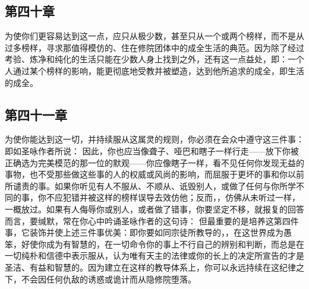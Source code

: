 \subsection{第四十章}

\par

为使你们更容易达到这一点，应只从极少数，甚至只从一个或两个榜样，而不是从过多榜样，寻求那值得模仿的、住在修院团体中的成全生活的典范。因为除了经过考验、炼净和纯化的生活只能在少数人身上找到之外，还有这一点益处，即：一个人通过某个榜样的影响，能更彻底地受教并被塑造，达到他所追求的成全，即生活的成全。\par


\subsection{第四十一章}

\par

为使你能达到这一切，并持续服从这属灵的规则，你必须在会众中遵守这三件事：即如圣咏作者所说： 因此，你也应当像聋子、哑巴和瞎子一样行走——放下你被正确选为完美模范的那一位的默观——你应像瞎子一样，看不见任何你发现无益的事物，也不受那些做这些事的人的权威或风尚的影响，而屈服于更坏的事和你以前所谴责的事。如果你听见有人不服从、不顺从、诋毁别人，或做了任何与你所学不同的事，你不应犯错并被这样的榜样误导去效仿他；反而，，仿佛从未听过一样，一概放过。如果有人侮辱你或别人，或者做了错事，你要坚定不移，就报复的回答而言，要缄默，常在你心中吟诵圣咏作者的这句诗： 但最重要的是培养这第四件事，它装饰并使上述三件事优美：即你要如同宗徒所教导的，，在这世界成为愚笨，好使你成为有智慧的，在一切命令你的事上不行自己的辨别和判断，而总是在一切纯朴和信德中表示服从，认为唯有天主的法律或你的长上的决定所宣告的才是圣洁、有益和智慧的。因为建立在这样的教导体系上，你可以永远持续在这纪律之下，不会因任何仇敌的诱惑或诡计而从隐修院堕落。\par

